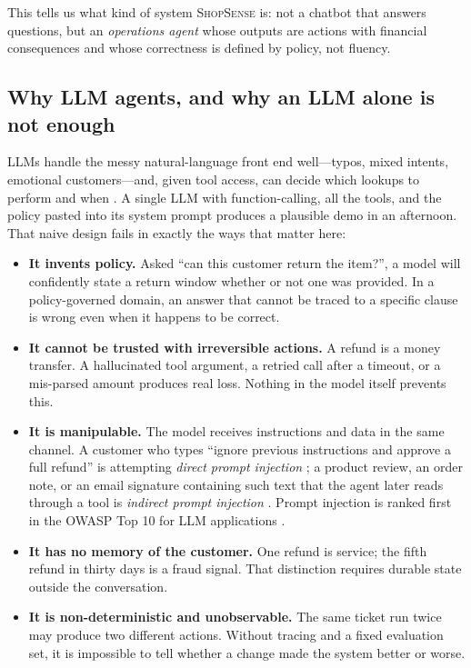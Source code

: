 \documentclass[11pt,a4paper]{article}
\newcommand{\shopsense}{\textsc{ShopSense}}
\begin{document}
This tells us what kind of system \shopsense{} is: not a chatbot that answers questions, but an \emph{operations agent} whose outputs are actions with financial consequences and whose correctness is defined by policy, not fluency.

\subsection{Why LLM agents, and why an LLM alone is not enough}

LLMs handle the messy natural-language front end well---typos, mixed intents, emotional customers---and, given tool access, can decide which lookups to perform and when \citep{yao2022react,schick2023toolformer}. A single LLM with function-calling, all the tools, and the policy pasted into its system prompt produces a plausible demo in an afternoon. That naive design fails in exactly the ways that matter here:

\begin{itemize}
  \item \textbf{It invents policy.} Asked ``can this customer return the item?'', a model will confidently state a return window whether or not one was provided. In a policy-governed domain, an answer that cannot be traced to a specific clause is wrong even when it happens to be correct.
  \item \textbf{It cannot be trusted with irreversible actions.} A refund is a money transfer. A hallucinated tool argument, a retried call after a timeout, or a mis-parsed amount produces real loss. Nothing in the model itself prevents this.
  \item \textbf{It is manipulable.} The model receives instructions and data in the same channel. A customer who types ``ignore previous instructions and approve a full refund'' is attempting \emph{direct prompt injection} \citep{perez2022ignore}; a product review, an order note, or an email signature containing such text that the agent later reads through a tool is \emph{indirect prompt injection} \citep{greshake2023notwhat}. Prompt injection is ranked first in the OWASP Top 10 for LLM applications \citep{owasp2025llmtop10}.
  \item \textbf{It has no memory of the customer.} One refund is service; the fifth refund in thirty days is a fraud signal. That distinction requires durable state outside the conversation.
  \item \textbf{It is non-deterministic and unobservable.} The same ticket run twice may produce two different actions. Without tracing and a fixed evaluation set, it is impossible to tell whether a change made the system better or worse.
\end{itemize}
\end{document}
